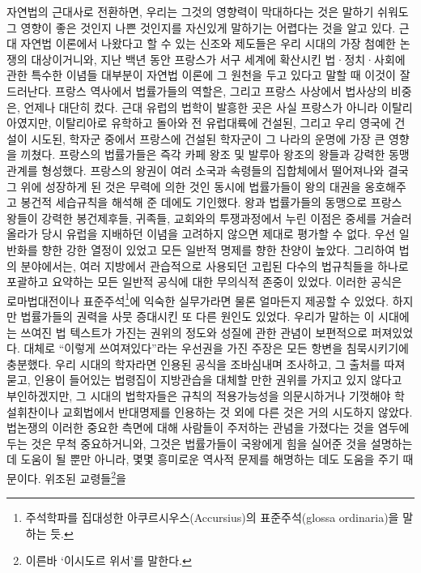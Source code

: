 자연법의 근대사로 전환하면, 우리는 그것의 영향력이 막대하다는 것은
말하기 쉬워도 그 영향이 좋은 것인지 나쁜 것인지를 자신있게
말하기는 어렵다는 것을 알고 있다.
근대 자연법 이론에서 나왔다고 할 수 있는 신조와 제도들은
우리 시대의 가장 첨예한 논쟁의 대상이거니와,
지난 백년 동안 프랑스가 서구 세계에 확산시킨 법^^b7정치^^b7사회에 관한
특수한 이념들 대부분이 자연법 이론에 그 원천을 두고 있다고 말할 때
이것이 잘 드러난다.
프랑스 역사에서 법률가들의 역할은,
그리고 프랑스 사상에서 법사상의 비중은,
언제나 대단히 컸다.
근대 유럽의 법학이 발흥한 곳은 사실 프랑스가 아니라 이탈리아였지만,
이탈리아로 유학하고 돌아와 전 유럽대륙에 건설된,
그리고  우리 영국에 건설이 시도된,
학자군 중에서 프랑스에 건설된 학자군이 그 나라의 운명에 가장 큰
영향을 끼쳤다.
프랑스의 법률가들은 즉각 카페 왕조 및 발루아 왕조의 왕들과
강력한 동맹관계를 형성했다.
프랑스의 왕권이 여러 소국과 속령들의 집합체에서 떨어져나와
결국 그 위에 성장하게 된 것은 무력에 의한 것인 동시에
법률가들이 왕의 대권을 옹호해주고 봉건적 세습규칙을 해석해 준 데에도 기인했다.
왕과 법률가들의 동맹으로 프랑스 왕들이
강력한 봉건제후들, 귀족들, 교회와의 투쟁과정에서 누린 이점은
중세를 거슬러 올라가 당시 유럽을 지배하던 이념을 고려하지 않으면
제대로 평가할 수 없다.
우선 일반화를 향한 강한 열정이 있었고 모든 일반적 명제를 향한 찬양이 높았다.
그리하여 법의 분야에서는, 여러 지방에서 관습적으로 사용되던 고립된
다수의 법규칙들을 하나로
포괄하고 요약하는 모든 일반적 공식에 대한 무의식적 존중이 있었다.
이러한 공식은 로마법대전이나 표준주석\footnote{%
  주석학파를 집대성한
  아쿠르시우스(Accursius)의 표준주석(glossa ordinaria)을 말하는 듯.}에
익숙한 실무가라면 물론 얼마든지 제공할 수 있었다.
하지만 법률가들의 권력을 사뭇 증대시킨 또 다른 원인도 있었다.
우리가 말하는 이 시대에는 쓰여진 법 텍스트가 가진는 권위의 정도와 성질에 관한
관념이 보편적으로 퍼져있었다.
대체로 ``이렇게 쓰여져있다''라는 우선권을 가진
주장은 모든 항변을 침묵시키기에 충분했다.
우리 시대의 학자라면 인용된 공식을 조바심내며 조사하고,
그 출처를 따져묻고,  인용이 들어있는 법령집이
지방관습을 대체할 만한 권위를 가지고 있지 않다고 부인하겠지만,
그 시대의 법학자들은 규칙의 적용가능성을 의문시하거나
기껏해야 학설휘찬이나 교회법에서 반대명제를 인용하는 것 외에
다른 것은 거의 시도하지 않았다.
법논쟁의 이러한 중요한 측면에 대해 사람들이 주저하는 관념을 가졌다는 것을
염두에 두는 것은 무척 중요하거니와,
그것은 법률가들이 국왕에게 힘을 실어준 것을 설명하는 데 도움이 될 뿐만 아니라,
몇몇 흥미로운 역사적 문제를 해명하는 데도 도움을 주기 때문이다.
위조된 교령들\footnote{%
  이른바 `이시도르 위서'를 말한다.}을
